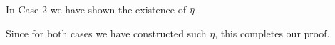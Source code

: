 \documentclass[12pt, cyan, night, 0.5in]{alittlebear}
\begin{document}
{\begin{proofcases}
{            In Case 2 we have shown the existence of $\eta$.
            
        }

    \end{proofcases}

    Since for both cases we have constructed such $\eta$, this completes our proof.




}
\end{document}
